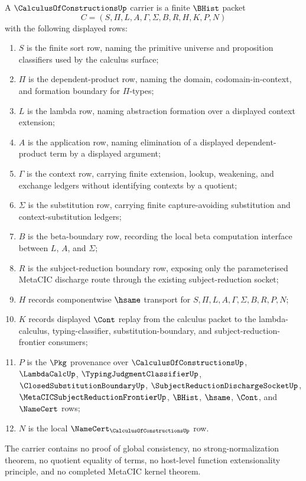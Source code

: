 \begin{definition}
\label{def:calculus-of-constructions-carrier}
A $\CalculusOfConstructionsUp$ carrier is a finite $\BHist$ packet
$$
C=(S,\Pi,L,A,\Gamma,\Sigma,B,R,H,K,P,N)
$$
with the following displayed rows:
\begin{enumerate}
\item $S$ is the finite sort row, naming the primitive universe and proposition classifiers used by the calculus surface;
\item $\Pi$ is the dependent-product row, naming the domain, codomain-in-context, and formation boundary for $\Pi$-types;
\item $L$ is the lambda row, naming abstraction formation over a displayed context extension;
\item $A$ is the application row, naming elimination of a displayed dependent-product term by a displayed argument;
\item $\Gamma$ is the context row, carrying finite extension, lookup, weakening, and exchange ledgers without identifying contexts by a quotient;
\item $\Sigma$ is the substitution row, carrying finite capture-avoiding substitution and context-substitution ledgers;
\item $B$ is the beta-boundary row, recording the local beta computation interface between $L$, $A$, and $\Sigma$;
\item $R$ is the subject-reduction boundary row, exposing only the parameterised MetaCIC discharge route through the existing subject-reduction socket;
\item $H$ records componentwise $\hsame$ transport for $S,\Pi,L,A,\Gamma,\Sigma,B,R,P,N$;
\item $K$ records displayed $\Cont$ replay from the calculus packet to the lambda-calculus, typing-classifier, substitution-boundary, and subject-reduction-frontier consumers;
\item $P$ is the $\Pkg$ provenance over $\CalculusOfConstructionsUp$, $\LambdaCalcUp$, $\TypingJudgmentClassifierUp$, $\ClosedSubstitutionBoundaryUp$, $\SubjectReductionDischargeSocketUp$, $\MetaCICSubjectReductionFrontierUp$, $\BHist$, $\hsame$, $\Cont$, and $\NameCert$ rows;
\item $N$ is the local $\NameCert_{\CalculusOfConstructionsUp}$ row.
\end{enumerate}
The carrier contains no proof of global consistency, no strong-normalization theorem, no quotient equality of terms, no host-level function extensionality principle, and no completed MetaCIC kernel theorem.
\end{definition}

